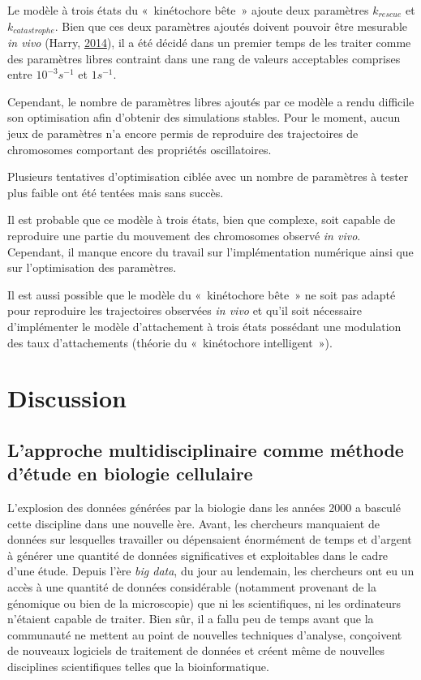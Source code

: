 \documentclass[12pt,a4paper,twoside,openright]{book}
\begin{document}
Le modèle à trois états du «~kinétochore bête~» ajoute deux paramètres
\(k_{rescue}\) et \(k_{catastrophe}\). Bien que ces deux paramètres
ajoutés doivent pouvoir être mesurable \emph{in vivo} (Harry,
\protect\hyperlink{ref-Harry2014}{2014}), il a été décidé dans un
premier temps de les traiter comme des paramètres libres contraint dans
une rang de valeurs acceptables comprises entre \(10^{-3} s^{-1}\) et
\(1 s^{-1}\).

Cependant, le nombre de paramètres libres ajoutés par ce modèle a rendu
difficile son optimisation afin d'obtenir des simulations stables. Pour
le moment, aucun jeux de paramètres n'a encore permis de reproduire des
trajectoires de chromosomes comportant des propriétés oscillatoires.

Plusieurs tentatives d'optimisation ciblée avec un nombre de paramètres
à tester plus faible ont été tentées mais sans succès.

Il est probable que ce modèle à trois états, bien que complexe, soit
capable de reproduire une partie du mouvement des chromosomes observé
\emph{in vivo}. Cependant, il manque encore du travail sur
l'implémentation numérique ainsi que sur l'optimisation des paramètres.

Il est aussi possible que le modèle du «~kinétochore bête~» ne soit pas
adapté pour reproduire les trajectoires observées \emph{in vivo} et
qu'il soit nécessaire d'implémenter le modèle d'attachement à trois
états possédant une modulation des taux d'attachements (théorie du
«~kinétochore intelligent~»).

\clearpage\null

\chapter{Discussion}\label{discussion}

\section{L'approche multidisciplinaire comme méthode d'étude en biologie
cellulaire}\label{lapproche-multidisciplinaire-comme-muxe9thode-duxe9tude-en-biologie-cellulaire}

L'explosion des données générées par la biologie dans les années 2000 a
basculé cette discipline dans une nouvelle ère. Avant, les chercheurs
manquaient de données sur lesquelles travailler ou dépensaient
énormément de temps et d'argent à générer une quantité de données
significatives et exploitables dans le cadre d'une étude. Depuis l'ère
\emph{big data}, du jour au lendemain, les chercheurs ont eu un accès à
une quantité de données considérable (notamment provenant de la
génomique ou bien de la microscopie) que ni les scientifiques, ni les
ordinateurs n'étaient capable de traiter. Bien sûr, il a fallu peu de
temps avant que la communauté ne mettent au point de nouvelles
techniques d'analyse, conçoivent de nouveaux logiciels de traitement de
données et créent même de nouvelles disciplines scientifiques telles que
la bioinformatique.
\end{document}
